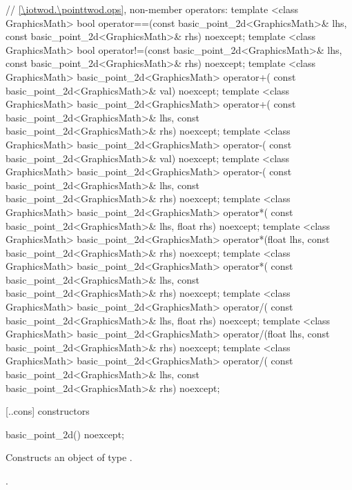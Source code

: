 \begin{codeblock}
{  // \ref{\iotwod.\pointtwod.ops}, non-member operators:
  template <class GraphicsMath>
  bool operator==(const basic_point_2d<GraphicsMath>& lhs,
    const basic_point_2d<GraphicsMath>& rhs) noexcept;
  template <class GraphicsMath>
  bool operator!=(const basic_point_2d<GraphicsMath>& lhs,
    const basic_point_2d<GraphicsMath>& rhs) noexcept;
  template <class GraphicsMath>
  basic_point_2d<GraphicsMath> operator+(
    const basic_point_2d<GraphicsMath>& val) noexcept;
  template <class GraphicsMath>
  basic_point_2d<GraphicsMath> operator+(
    const basic_point_2d<GraphicsMath>& lhs,
    const basic_point_2d<GraphicsMath>& rhs) noexcept;
  template <class GraphicsMath>
  basic_point_2d<GraphicsMath> operator-(
    const basic_point_2d<GraphicsMath>& val) noexcept;
  template <class GraphicsMath>
  basic_point_2d<GraphicsMath> operator-(
    const basic_point_2d<GraphicsMath>& lhs,
    const basic_point_2d<GraphicsMath>& rhs) noexcept;
  template <class GraphicsMath>
  basic_point_2d<GraphicsMath> operator*(
    const basic_point_2d<GraphicsMath>& lhs,
    float rhs) noexcept;
  template <class GraphicsMath>
  basic_point_2d<GraphicsMath> operator*(float lhs,
    const basic_point_2d<GraphicsMath>& rhs) noexcept;
  template <class GraphicsMath>
  basic_point_2d<GraphicsMath> operator*(
    const basic_point_2d<GraphicsMath>& lhs,
    const basic_point_2d<GraphicsMath>& rhs) noexcept;
  template <class GraphicsMath>
  basic_point_2d<GraphicsMath> operator/(
    const basic_point_2d<GraphicsMath>& lhs,
    float rhs) noexcept;
  template <class GraphicsMath>
  basic_point_2d<GraphicsMath> operator/(float lhs,
    const basic_point_2d<GraphicsMath>& rhs) noexcept;
  template <class GraphicsMath>
  basic_point_2d<GraphicsMath> operator/(
    const basic_point_2d<GraphicsMath>& lhs,
    const basic_point_2d<GraphicsMath>& rhs) noexcept;
}
\end{codeblock}

 [\iotwod.\pointtwod.cons] { constructors}

%
\begin{itemdecl}
basic_point_2d() noexcept;
\end{itemdecl}
\begin{itemdescr}
\pnum
\effects
Constructs an object of type .

\pnum
\postconditions
{}.
\end{itemdescr}


